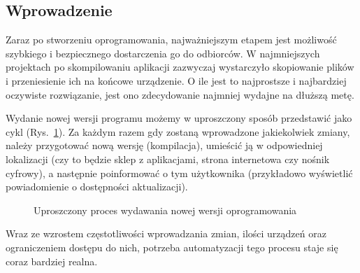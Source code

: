 \subsection{Wprowadzenie}
Zaraz po stworzeniu oprogramowania, najważniejszym etapem jest możliwość szybkiego 
i bezpiecznego dostarczenia go do odbiorców.
W najmniejszych projektach po skompilowaniu aplikacji zazwyczaj wystarczyło skopiowanie plików
i przeniesienie ich na końcowe urządzenie. O ile jest to najprostsze i najbardziej oczywiste rozwiązanie,
jest ono zdecydowanie najmniej wydajne na dłuższą metę.

Wydanie nowej wersji programu możemy w uproszczony sposób przedstawić jako cykl (Rys.~\ref{fig:cyklZmian}).
Za każdym razem gdy zostaną wprowadzone jakiekolwiek zmiany, należy przygotować nową wersję (kompilacja),
umieścić ją w odpowiedniej lokalizacji (czy to będzie sklep z aplikacjami, strona internetowa czy nośnik cyfrowy),
a następnie poinformować o tym użytkownika (przykładowo wyświetlić powiadomienie o dostępności aktualizacji).


\begin{figure}[!htp]
    \centering
    \caption{Uproszczony proces wydawania nowej wersji oprogramowania}
    \label{fig:cyklZmian}
\end{figure}

Wraz ze wzrostem częstotliwości wprowadzania zmian, ilości urządzeń oraz ograniczeniem dostępu do nich,
potrzeba automatyzacji tego procesu staje się coraz bardziej realna.